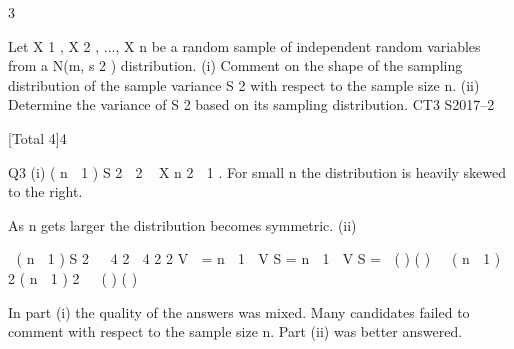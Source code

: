 \documentclass[a4paper,12pt]{article}
\begin{document}
3


Let X 1 , X 2 , ..., X n be a random sample of independent random variables from a
N(m, s 2 ) distribution.
(i) Comment on the shape of the sampling distribution of the sample variance S 2
with respect to the sample size n.
(ii)
 Determine the variance of S 2 based on its sampling distribution.
CT3 S2017–2

[Total 4]4

Q3
(i)
( n  1 ) S 2

2
~ X n 2  1 . For small n the distribution is heavily skewed to the right.

As n gets larger the distribution becomes symmetric.
(ii)

 ( n  1 ) S 2 
 4
2  4
2
2
V 
\;=
n

1

V
S
\;=
n

1

V
S
\;=\;

(
)
(
)


( n  1 )
 2
( n  1 ) 2


( )
( )

In part (i) the quality of the answers was mixed. Many candidates
failed to comment with respect to the sample size n. Part (ii) was better
answered.
\end{document}
